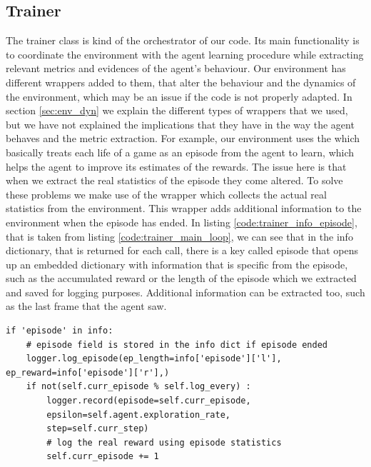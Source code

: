\subsection{Trainer}
The trainer class is kind of the orchestrator of our code. Its main functionality is to coordinate the environment with the agent learning procedure while extracting relevant metrics and evidences of the agent's behaviour. Our environment has different wrappers added to them, that alter the behaviour and the dynamics of the environment, which may be an issue if the code is not properly adapted. In section \ref{sec:env_dyn} we explain the different types of wrappers that we used, but we have not explained the implications that they have in the way the agent behaves and the metric extraction. For example, our environment uses the  which basically treats each life of a game as an episode from the agent to learn, which helps the agent to improve its estimates of the rewards. The issue here is that when we extract the real statistics of the episode they come altered. To solve these problems we make use of the wrapper  which collects the actual real statistics from the environment. This wrapper adds additional information to the environment when the episode has ended. In listing \ref{code:trainer_info_episode}, that is taken from listing \ref{code:trainer_main_loop}, we can see that in the info dictionary, that is returned for each  call, there is a key called episode that opens up an embedded dictionary with information that is specific from the episode, such as the accumulated reward or the length of the episode which we extracted and saved for logging purposes. Additional information can be extracted too, such as the last frame that the agent saw.

\begin{lstlisting}[caption={Episodic information retrival from \inlinecode{RecordEpisodeStatistics} wrapper}, label={code:trainer_info_episode}]
if 'episode' in info:
	# episode field is stored in the info dict if episode ended
	logger.log_episode(ep_length=info['episode']['l'], ep_reward=info['episode']['r'],)
	if not(self.curr_episode % self.log_every) :
		logger.record(episode=self.curr_episode, 
		epsilon=self.agent.exploration_rate, 
		step=self.curr_step)
		# log the real reward using episode statistics
		self.curr_episode += 1
\end{lstlisting}

